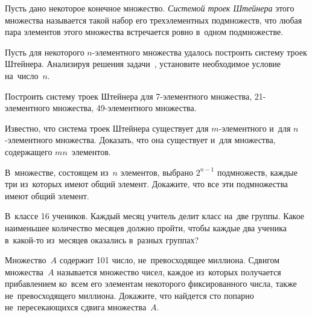 Пусть дано некоторое конечное множество.
\emph{Системой троек Штейнера} этого множества называется такой набор его
трехэлементных подмножеств, что любая пара элементов этого множества
встречается ровно в~одном подмножестве.

\begin{problems}

\item
Пусть для некоторого $n$-элементного множества удалось построить
систему троек Штейнера.
Анализируя решения
задачи~,
установите необходимое условие на~число~$n$.

\item
Построить систему троек Штейнера для
7-элементного множества, 21-элементного множества, 49-элементного множества.

\item
Известно, что система троек Штейнера существует для $m$-элементного и~для
$n$-элементного множества.
Доказать, что она существует и~для множества, содержащего $mn$~элементов.

\item
В~множестве, состоящем из~$n$ элементов, выбрано $2^{n-1}$ подмножеств,
каждые три из~которых имеют общий элемент.
Докажите, что все эти подмножества имеют общий элемент.

\item
В~классе 16 учеников.
Каждый месяц учитель делит класс на~две группы.
Какое наименьшее количество месяцев должно пройти, чтобы каждые два ученика
в~какой-то из~месяцев оказались в~разных группах?

\item
Множество~$A$ содержит 101 число, не~превосходящее миллиона.
Сдвигом множества~$A$ называется множество чисел, каждое из~которых получается
прибавлением ко~всем его элементам некоторого фиксированного числа, также
не~превосходящего миллиона.
Докажите, что найдется сто попарно не~пересекающихся сдвига множества~$A$.

\end{problems}

\endgroup

